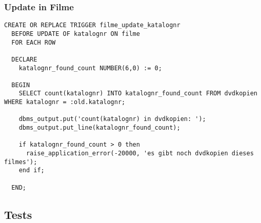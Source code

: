 \documentclass[11pt,a4paper,parskip=half]{scrartcl}
\begin{document}
\subsubsection{Update in Filme}
\begin{lstlisting}
CREATE OR REPLACE TRIGGER filme_update_katalognr
  BEFORE UPDATE OF katalognr ON filme
  FOR EACH ROW
  
  DECLARE
    katalognr_found_count NUMBER(6,0) := 0;
    
  BEGIN
    SELECT count(katalognr) INTO katalognr_found_count FROM dvdkopien WHERE katalognr = :old.katalognr;
    
    dbms_output.put('count(katalognr) in dvdkopien: ');
    dbms_output.put_line(katalognr_found_count);
    
    if katalognr_found_count > 0 then
      raise_application_error(-20000, 'es gibt noch dvdkopien dieses filmes');
    end if;
    
  END;
\end{lstlisting}

\subsection{Tests}
\end{document}
